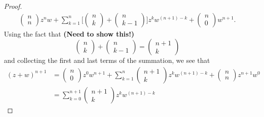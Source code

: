 \documentclass[a4paper]{article}
\begin{document}
\begin{enumerate}
\begin{proof}
\begin{align*}
\begin{pmatrix}
                                               n \\
                                               n 
                                               \end{pmatrix} z^{n} w + \sum_{ k=1  }^{ n } \Bigg[ \begin{pmatrix} n \\ k  \end{pmatrix} + \begin{pmatrix} n \\ k - 1  \end{pmatrix}\Bigg] z^{k } w^{(n+1)-k}  +  \begin{pmatrix} 
                                                                n \\
                                                                0  
                                                            \end{pmatrix} w^{n+1}.
        \end{align*}
        Using the fact that \textbf{(Need to show this!)} 
        \[  \begin{pmatrix} n \\ k  \end{pmatrix}  + \begin{pmatrix} n \\ k - 1  \end{pmatrix}  = \begin{pmatrix} n + 1 \\ k  \end{pmatrix}     \]
        and collecting the first and last terms of the summation, we see that 
        \begin{align*}
            (z+w)^{n+1} &= \begin{pmatrix} n \\ 0  \end{pmatrix} z^{0} w^{n+1} + \sum_{ k=1  }^{ n } \begin{pmatrix} n + 1 \\ k  \end{pmatrix}  z^{k } w^{(n+1)- k} + \begin{pmatrix} n \\ n  \end{pmatrix} z^{n+1} w^{0}  \\
                        &= \sum_{ k=0  }^{ n + 1   } \begin{pmatrix} n + 1 \\ k  \end{pmatrix} z^{k } w^{(n+1) - k} 

\end{align*}
\end{proof}
\end{enumerate}
\end{document}
